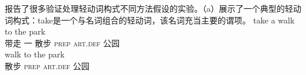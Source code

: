 \begin{exe}
\begin{xlist}[iv.]
\begin{exe}
\begin{xlist}[iv.]
 \citet*{WJKP2014a}报告了很多验证处理轻动词构式不同方法假设的实验。（a）展示了一个典型的轻动词构式：take是一个与名词组合的轻动词，该名词充当主要的谓项。
\eal
\ex 
\gll take a walk to the park\\
     带走 一 散步 \textsc{prep} \textsc{art}.\textsc{def} 公园\\
\ex
\gll walk to the park\\
     散步 \textsc{prep} \textsc{art}.\textsc{def} 公园\\
\zl


\end{xlist}
\end{exe}
\end{xlist}
\end{exe}
